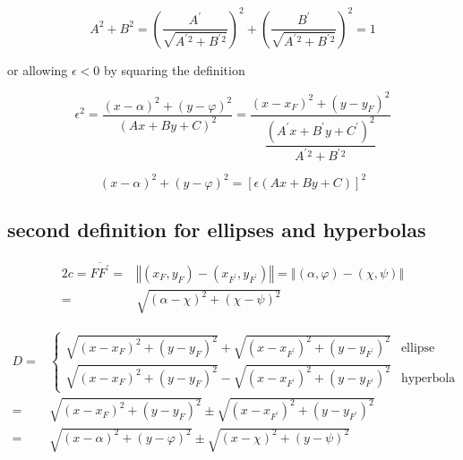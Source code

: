 \documentclass[
]{book}
\theoremstyle{definition}
\theoremstyle{definition}
\theoremstyle{definition}
\theoremstyle{definition}
\theoremstyle{remark}
\begin{document}
\[
A^{2}+B^{2}=\left(\dfrac{A^{\prime}}{\sqrt{A^{\prime}{}^{2}+B^{\prime}{}^{2}}}\right)^{2}+\left(\dfrac{B^{\prime}}{\sqrt{A^{\prime}{}^{2}+B^{\prime}{}^{2}}}\right)^{2}=1
\]

or allowing \(\epsilon<0\) by squaring the definition

\[
\epsilon^{2}=\dfrac{\left(x-\alpha\right)^{2}+\left(y-\varphi\right)^{2}}{\left(Ax+By+C\right)^{2}}=\dfrac{\left(x-x_{{\scriptscriptstyle F}}\right)^{2}+\left(y-y_{{\scriptscriptstyle F}}\right)^{2}}{\dfrac{\left(A^{\prime}x+B^{\prime}y+C^{\prime}\right)^{2}}{A^{\prime}{}^{2}+B^{\prime}{}^{2}}}
\]

\[
\left(x-\alpha\right)^{2}+\left(y-\varphi\right)^{2}=\left[\epsilon\left(Ax+By+C\right)\right]^{2}
\]

\subsection{second definition for ellipses and hyperbolas}\label{second-definition-for-ellipses-and-hyperbolas}

\[
\begin{aligned}
2c=\overline{FF^{\prime}}= & \left\Vert \left(x_{{\scriptscriptstyle F}},y_{{\scriptscriptstyle F}}\right)-\left(x_{{\scriptscriptstyle F^{\prime}}},y_{{\scriptscriptstyle F^{\prime}}}\right)\right\Vert =\left\Vert \left(\alpha,\varphi\right)-\left(\chi,\psi\right)\right\Vert \\
= & \sqrt{\left(\alpha-\chi\right)^{2}+\left(\chi-\psi\right)^{2}}
\end{aligned}
\]

\[
\begin{aligned}
D= & \begin{cases}
\sqrt{\left(x-x_{{\scriptscriptstyle F}}\right)^{2}+\left(y-y_{{\scriptscriptstyle F}}\right)^{2}}+\sqrt{\left(x-x_{{\scriptscriptstyle F^{\prime}}}\right)^{2}+\left(y-y_{{\scriptscriptstyle F^{\prime}}}\right)^{2}} & \text{ellipse}\\
\sqrt{\left(x-x_{{\scriptscriptstyle F}}\right)^{2}+\left(y-y_{{\scriptscriptstyle F}}\right)^{2}}-\sqrt{\left(x-x_{{\scriptscriptstyle F^{\prime}}}\right)^{2}+\left(y-y_{{\scriptscriptstyle F^{\prime}}}\right)^{2}} & \text{hyperbola}
\end{cases}\\
= & \sqrt{\left(x-x_{{\scriptscriptstyle F}}\right)^{2}+\left(y-y_{{\scriptscriptstyle F}}\right)^{2}}\pm\sqrt{\left(x-x_{{\scriptscriptstyle F^{\prime}}}\right)^{2}+\left(y-y_{{\scriptscriptstyle F^{\prime}}}\right)^{2}}\\
= & \sqrt{\left(x-\alpha\right)^{2}+\left(y-\varphi\right)^{2}}\pm\sqrt{\left(x-\chi\right)^{2}+\left(y-\psi\right)^{2}}
\end{aligned}
\]
\end{document}

